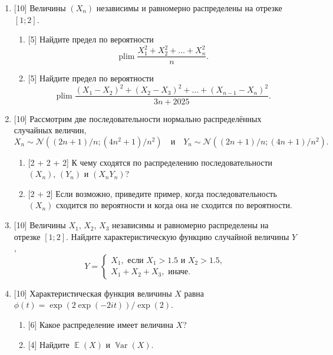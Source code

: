 \documentclass[12pt]{article}
\DeclareMathOperator{\Var}{\mathbb{V}ar}
\DeclareMathOperator{\E}{\mathbb{E}}
\DeclareMathOperator{\plim}{plim}
\newcommand{\cN}{\mathcal{N}}
\begin{document}
\begin{enumerate}
\item {[10]} Величины $(X_n)$ независимы и равномерно распределены на отрезке $[1; 2]$.
\begin{enumerate}
\item {[5]} Найдите предел по вероятности
\[
\plim \frac{X_1^2 + X_2^2 + \dots + X_n^2}{n}.
\]
\item {[5]} Найдите предел по вероятности 
\[
    \plim \frac{(X_1 - X_2)^2 + (X_2 - X_3)^2 + \dots + (X_{n-1} - X_n)^2}{3n + 2025}.
\]
\end{enumerate}

\item {[10]} Рассмотрим две последовательности нормально распределённых случайных величин, 
\[
X_n \sim \cN((2n+1)/n; (4n^2 + 1) / n^2) \quad \text{и} \quad Y_n \sim \cN((2n + 1)/n; (4n + 1) / n^2).
\]
\begin{enumerate}
    \item {[2 + 2 + 2]} К чему сходятся по распределению последовательности $(X_n)$, $(Y_n)$ и $(X_n Y_n)$?
    \item {[2 + 2]} Если возможно, приведите пример, когда последовательность $(X_n)$ сходится по вероятности и когда она не сходится по вероятности.
\end{enumerate}
    \newpage

\item {[10]} Величины $X_1$, $X_2$, $X_3$ независимы и равномерно распределены на отрезке $[1;2]$.
Найдите характеристическую функцию случайной величины $Y$,
\[
Y = \begin{cases}
    X_1, \text{ если } X_1 > 1.5 \text{ и } X_2 > 1.5, \\
    X_1 + X_2 + X_3, \text{ иначе.}
\end{cases}
\]

\item {[10]} Характеристическая функция величины $X$ равна $\phi(t) = \exp(2\exp(-2it))/\exp(2)$.
\begin{enumerate}
    \item {[6]} Какое распределение имеет величина $X$?
    \item {[4]} Найдите $\E(X)$ и $\Var(X)$.
\end{enumerate}

    \newpage


\end{enumerate}
\end{document}

